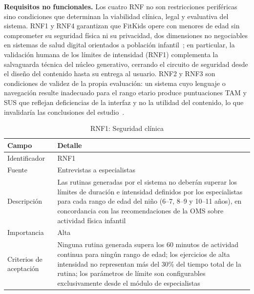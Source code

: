					\textbf{Requisitos no funcionales.} Los cuatro RNF no son restricciones periféricas sino condiciones que determinan la viabilidad clínica, legal y evaluativa del sistema. RNF1 y RNF4 garantizan que FitKids opere con menores de edad sin comprometer su seguridad física ni su privacidad, dos dimensiones no negociables en sistemas de salud digital orientados a población infantil~\cite{LOPDP2021,GDPR2016,Bull2020}; en particular, la validación humana de los límites de intensidad (RNF1) complementa la salvaguarda técnica del núcleo generativo, cerrando el circuito de seguridad desde el diseño del contenido hasta su entrega al usuario. RNF2 y RNF3 son condiciones de validez de la propia evaluación: un sistema cuyo lenguaje o navegación resulte inadecuado para el rango etario produce puntuaciones TAM y SUS que reflejan deficiencias de la interfaz y no la utilidad del contenido, lo que invalidaría las conclusiones del estudio~\cite{Bangor2009,Nielsen1994,Hourcade2015}.
					
					\begin{table}[H]
						\centering\small
						\caption{RNF1: Seguridad clínica}
						\label{tab:rnf1}
						\begin{tabular}{p{3.5cm}p{11cm}}
							\hline
							\textbf{Campo} & \textbf{Detalle} \\
							\hline
							Identificador & RNF1 \\
							
							Fuente & Entrevistas a especialistas \\
							
							Descripción & Las rutinas generadas por el sistema no deberán superar los límites de duración e intensidad definidos por los especialistas para cada rango de edad del niño (6--7, 8--9 y 10--11 años), en concordancia con las recomendaciones de la OMS sobre actividad física infantil~\cite{Bull2020} \\
							
							Importancia & Alta \\
							
							Criterios de aceptación & Ninguna rutina generada supera los 60 minutos de actividad continua para ningún rango de edad; los ejercicios de alta intensidad no representan más del 30\% del tiempo total de la rutina; los parámetros de límite son configurables exclusivamente desde el módulo de especialistas \\
							\hline
						\end{tabular}
					\end{table} \tblnote
					
